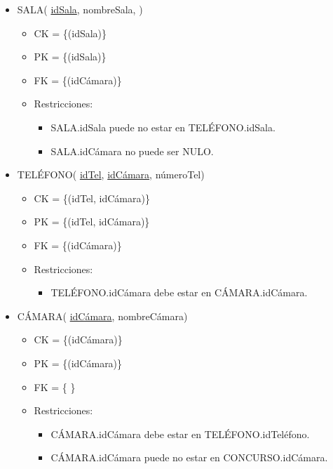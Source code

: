 \begin{itemize}
\item SALA( \underline{idSala}, nombreSala, )
	\begin{itemize}
		\item CK = \{(idSala)\}
		\item PK = \{(idSala)\}
		\item FK = \{(idCámara)\}
		\item Restricciones:
			\begin{itemize}
			\item SALA.idSala puede no estar en TELÉFONO.idSala.
			\item SALA.idCámara no puede ser NULO.
			\\
			\end{itemize}
	\end{itemize}
	
	
\item TELÉFONO( \underline{idTel}, \underline{idCámara}, númeroTel) 
	\begin{itemize}
		\item CK = \{(idTel, idCámara)\}
		\item PK = \{(idTel, idCámara)\}
		\item FK = \{(idCámara)\}
		\item Restricciones:
			\begin{itemize}
			\item TELÉFONO.idCámara debe estar en CÁMARA.idCámara.
			\\
			\end{itemize}
	\end{itemize}


\item CÁMARA( \underline{idCámara}, nombreCámara)
	\begin{itemize}
		\item CK = \{(idCámara)\}
		\item PK = \{(idCámara)\}
		\item FK = \{ \}
		\item Restricciones:
			\begin{itemize}
			\item CÁMARA.idCámara debe estar en TELÉFONO.idTeléfono.
			\item CÁMARA.idCámara puede no estar en CONCURSO.idCámara.
			\\			
			\end{itemize}
	\end{itemize}
		

\end{itemize}
